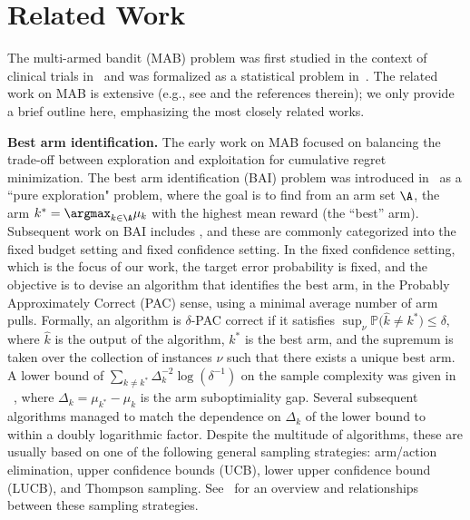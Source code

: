 \section{Related Work}
The multi-armed bandit (MAB) problem was first studied in the context of clinical trials in~\cite{thompson1933likelihood} and was formalized as a statistical problem in~\cite{Robbins1952SomeAO}. The related work on MAB is extensive (e.g., see \cite{slivkins2019introduction, Csa18} and the references therein); we only provide a brief outline here, emphasizing the most closely related works.

\textbf{Best arm identification.}
The early work on MAB focused on balancing the trade-off between exploration 
and exploitation
for cumulative regret minimization.
The best arm identification (BAI) problem was introduced in~\cite{EvenDar2002PACBF} as a ``pure exploration" problem, where the goal is to find from an arm set $\A$, the arm $k^* = \argmax_{k \in \A} \mu_k$ with the highest mean reward (the ``best'' arm).
Subsequent work on BAI includes \cite{bubeck2009pure, Audibert2010BestAI, gabillon2012unified, karnin2013almost, jamieson2014lil, kaufmann2016complexity, garivier2016optimal}, and these are commonly categorized into the
fixed budget setting and fixed confidence setting.
In the fixed confidence setting, which is the focus of our work, the target error probability is fixed, and the objective is to devise an algorithm that identifies the best arm, in the Probably Approximately Correct (PAC) sense, using a minimal average number of arm pulls.  
Formally, an algorithm is $\delta$-PAC correct if it satisfies 
$
    \sup_{\nu} \mathbb{P}\big(\hat{k} \ne k^* \big) \le \delta,
$ where $\hat{k}$ is the output of the algorithm, $k^*$ is the best arm, and the supremum is taken over the collection of instances $\nu$ such that there exists a unique best arm.
A lower bound of $\sum_{k \ne k^*} \Delta_k^{-2} \log(\delta^{-1})$ on the sample complexity was given in
~\cite{mannor2004sample}, where $\Delta_k = \mu_{k^*} - \mu_k$ is the arm suboptimiality gap.
Several subsequent algorithms managed to match the dependence on $\Delta_k$ of the lower bound to within a doubly logarithmic factor. 
Despite the multitude of algorithms, these are usually based on one of the following general sampling strategies: arm/action elimination, upper confidence bounds (UCB), lower upper confidence bound (LUCB), and Thompson sampling.  See~\cite{jamieson2014best} for an overview and relationships between these sampling strategies.


